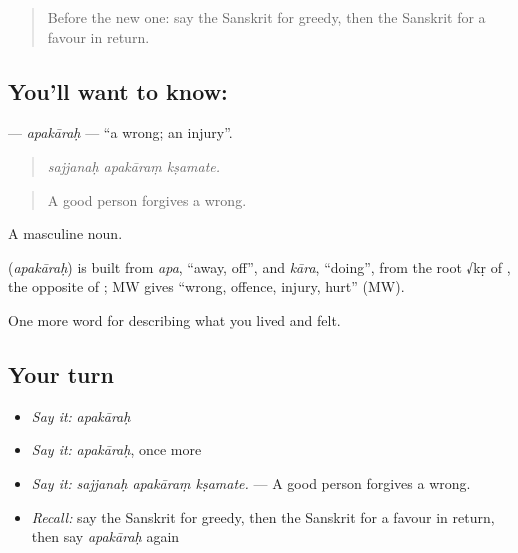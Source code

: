 \begin{quote}
Before the new one: say the Sanskrit for greedy, then the Sanskrit for a favour in return.
\end{quote}

\subsection*{You'll want to know: }
\textbf{} — \emph{apakāraḥ} — \textquotedblleft{}a wrong; an injury\textquotedblright{}.

\begin{quote}
  
\end{quote}

\begin{quote}
\emph{sajjanaḥ apakāraṃ kṣamate.}
\end{quote}

\begin{quote}
A good person forgives a wrong.
\end{quote}

A masculine noun.

\begin{cousinweb}
\textbf{} (\emph{apakāraḥ}) is built from \emph{apa}, \textquotedblleft{}away, off\textquotedblright{}, and \emph{kāra}, \textquotedblleft{}doing\textquotedblright{}, from the root √kṛ of \textbf{}, the opposite of \textbf{}; MW gives \textquotedblleft{}wrong, offence, injury, hurt\textquotedblright{} (MW).
\end{cousinweb}

\begin{grammarlens}[title={What you've built}]
One more word for describing what you lived and felt.
\end{grammarlens}

\subsection*{Your turn}
\begin{itemize}
\raggedright
  \item \emph{Say it:} \emph{apakāraḥ}
  \item \emph{Say it:} \emph{apakāraḥ}, once more
  \item \emph{Say it:} \emph{sajjanaḥ apakāraṃ kṣamate.} — A good person forgives a wrong.
  \item \emph{Recall:} say the Sanskrit for greedy, then the Sanskrit for a favour in return, then say \emph{apakāraḥ} again
\end{itemize}

